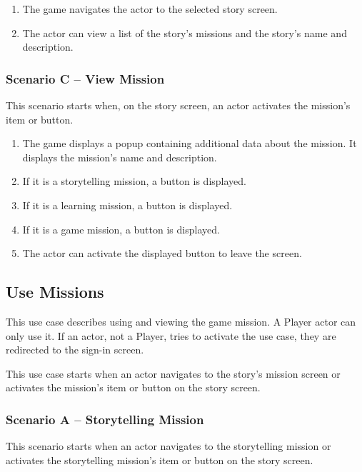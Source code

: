 \begin{enumerate}
    \item The game navigates the actor to the selected story screen.
    \item The actor can view a list of the story's missions and the story's name and description.
\end{enumerate}

\subsubsection*{Scenario C -- View Mission}

This scenario starts when, on the story screen, an actor activates the mission's item or button.

\begin{enumerate}
    \item The game displays a popup containing additional data about the mission.
    It displays the mission's name and description.
    \item If it is a storytelling mission, a  button is displayed.
    \item If it is a learning mission, a  button is displayed.
    \item If it is a game mission, a  button is displayed.
    \item The actor can activate the displayed button to leave the screen.
\end{enumerate}

\pagebreak
\subsection{Use Missions}

This use case describes using and viewing the game mission.
A Player actor can only use it.
If an actor, not a Player, tries to activate the use case, they are redirected to the sign-in screen.

This use case starts when an actor navigates to the story's mission screen or activates the mission's item or button on the story screen.

\subsubsection*{Scenario A -- Storytelling Mission}

This scenario starts when an actor navigates to the storytelling mission or activates the storytelling mission's item or button on the story screen.

